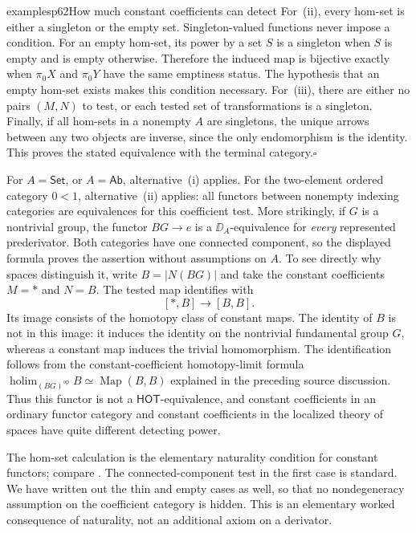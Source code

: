 \begin{dcomment}{examples}{p62}{How much constant coefficients can detect}
For~(ii), every hom-set is either a singleton or the empty set. Singleton-valued functions never impose a condition. For an empty hom-set, its power by a set $S$ is a singleton when $S$ is empty and is empty otherwise. Therefore the induced map is bijective exactly when $\pi_0X$ and $\pi_0Y$ have the same emptiness status. The hypothesis that an empty hom-set exists makes this condition necessary. For~(iii), there are either no pairs $(M,N)$ to test, or each tested set of transformations is a singleton. Finally, if all hom-sets in a nonempty $A$ are singletons, the unique arrows between any two objects are inverse, since the only endomorphism is the identity. This proves the stated equivalence with the terminal category.\hfill$\square$

For $A=\mathsf{Set}$, or $A=\mathsf{Ab}$, alternative~(i) applies. For the two-element ordered category $0<1$, alternative~(ii) applies: all functors between nonempty indexing categories are equivalences for this coefficient test. More strikingly, if $G$ is a nontrivial group, the functor $BG\to e$ is a $\DD_A$-equivalence for \emph{every} represented prederivator. Both categories have one connected component, so the displayed formula proves the assertion without assumptions on $A$. To see directly why spaces distinguish it, write $B=|N(BG)|$ and take the constant coefficients $M=*$ and $N=B$. The tested map identifies with
\[
 [*,B]\longrightarrow[B,B].
\]
Its image consists of the homotopy class of constant maps. The identity of $B$ is not in this image: it induces the identity on the nontrivial fundamental group $G$, whereas a constant map induces the trivial homomorphism. The identification follows from the constant-coefficient homotopy-limit formula $\operatorname{holim}_{(BG)^{\mathrm{op}}} B\simeq\operatorname{Map}(B,B)$ explained in the preceding source discussion. Thus this functor is not a $\mathsf{HOT}$-equivalence, and constant coefficients in an ordinary functor category and constant coefficients in the localized theory of spaces have quite different detecting power.

The hom-set calculation is the elementary naturality condition for constant functors; compare \citet[\S\S1.4 and~1.7]{Riehl2016}. The connected-component test in the first case is standard. We have written out the thin and empty cases as well, so that no nondegeneracy assumption on the coefficient category is hidden. This is an elementary worked consequence of naturality, not an additional axiom on a derivator.
\end{dcomment}



